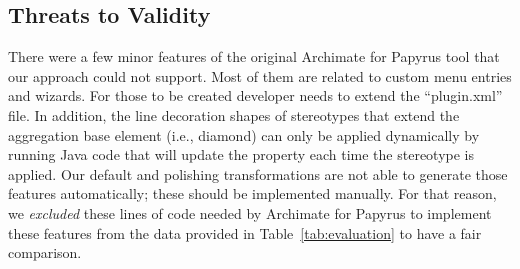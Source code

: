 \subsection{Threats to Validity}
There were a few minor features of the original Archimate for Papyrus tool that our approach could not support. Most of them are related to custom menu entries and wizards. For those to be created developer needs to extend the ``plugin.xml'' file. In addition, the line decoration shapes of stereotypes that extend the aggregation base element (i.e., diamond) can only be applied dynamically by running Java code that will update the property each time the stereotype is applied. Our default and polishing transformations are not able to generate those features automatically; these should be implemented manually. For that reason, we \textit{excluded} these lines of code needed by Archimate for Papyrus to implement these features from the data provided in Table~\ref{tab:evaluation} to have a fair comparison. 

